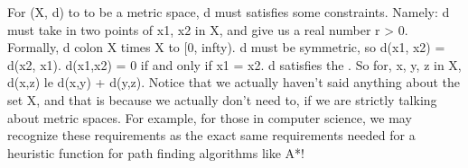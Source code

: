 {}For \markdownRendererDollarSign{}(X, d)\markdownRendererDollarSign{} to to be a metric space, \markdownRendererDollarSign{}d\markdownRendererDollarSign{} must satisfies some\markdownRendererSoftLineBreak
{}constraints. Namely:\markdownRendererInterblockSeparator
{}\markdownRendererOlBeginTight
{}\markdownRendererDollarSign{}d\markdownRendererDollarSign{} must take in two points of \markdownRendererDollarSign{}x\markdownRendererUnderscore{}1, x\markdownRendererUnderscore{}2 \markdownRendererBackslash{}in X\markdownRendererDollarSign{}, and give us a real number \markdownRendererDollarSign{}r > 0\markdownRendererDollarSign{}. Formally, \markdownRendererDollarSign{}d \markdownRendererBackslash{}colon X \markdownRendererBackslash{}times X \markdownRendererBackslash{}to [0, \markdownRendererBackslash{}infty)\markdownRendererDollarSign{}.\markdownRendererOlItemEnd 
{}\markdownRendererDollarSign{}d\markdownRendererDollarSign{} must be symmetric, so \markdownRendererDollarSign{}d(x\markdownRendererUnderscore{}1, x\markdownRendererUnderscore{}2) = d(x\markdownRendererUnderscore{}2, x\markdownRendererUnderscore{}1)\markdownRendererDollarSign{}.\markdownRendererOlItemEnd 
{}\markdownRendererDollarSign{}d(x\markdownRendererUnderscore{}1,x\markdownRendererUnderscore{}2) = 0\markdownRendererDollarSign{}  if and only if \markdownRendererDollarSign{}x\markdownRendererUnderscore{}1 = x\markdownRendererUnderscore{}2\markdownRendererDollarSign{}.\markdownRendererOlItemEnd 
{}\markdownRendererDollarSign{}d\markdownRendererDollarSign{} satisfies the . So for, \markdownRendererDollarSign{}x, y, z \markdownRendererBackslash{}in X\markdownRendererDollarSign{}, \markdownRendererDollarSign{}d(x,z) \markdownRendererBackslash{}le d(x,y) + d(y,z)\markdownRendererDollarSign{}.\markdownRendererOlItemEnd 
\markdownRendererOlEndTight \markdownRendererInterblockSeparator
{}Notice that we actually haven't said anything about the set \markdownRendererDollarSign{}X\markdownRendererDollarSign{},\markdownRendererSoftLineBreak
{}and that is because we actually don't need to, if we are strictly\markdownRendererSoftLineBreak
{}talking about metric spaces. For example, for those in computer\markdownRendererSoftLineBreak
{}science, we may recognize these requirements as the exact same\markdownRendererSoftLineBreak
{}requirements needed for a heuristic function for path finding\markdownRendererSoftLineBreak
{}algorithms like A*!\markdownRendererParagraphSeparator
